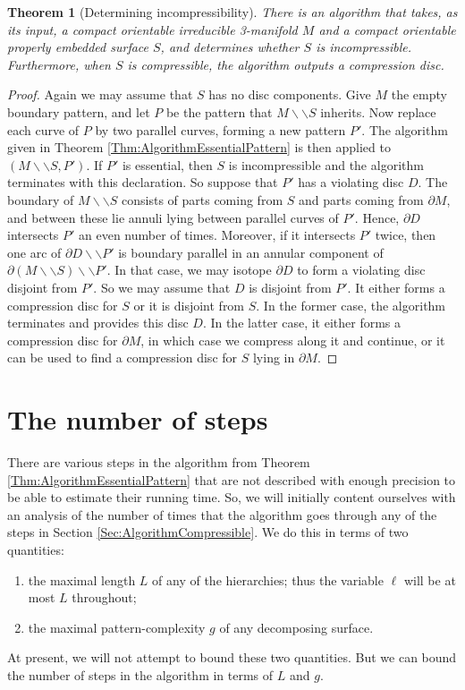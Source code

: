 \documentclass[oneside]{amsart}
\numberwithin{equation}{section}
\theoremstyle{plain}
\newtheorem{theorem}[equation]{Theorem}
\theoremstyle{definition}
\newcommand{\cut}{\backslash\backslash}
\begin{document}
\begin{theorem}[{\sc Determining incompressibility}] 
There is an algorithm that takes, as its input, a compact orientable irreducible 3-manifold $M$ and a compact orientable properly embedded surface $S$, 
and determines whether $S$ is incompressible. Furthermore, when $S$ is compressible, the algorithm outputs a compression disc.
\end{theorem}

\begin{proof}
Again we may assume that $S$ has no disc components.
Give $M$ the empty boundary pattern, and let $P$ be the pattern that $M \cut S$ inherits. Now replace each curve of $P$ by two parallel curves, forming a new pattern $P'$. The algorithm given in Theorem \ref{Thm:AlgorithmEssentialPattern} is then applied to $(M \cut S, P')$.  If $P'$ is essential, then $S$ is incompressible and the algorithm terminates with this declaration. So suppose that $P'$ has a violating disc $D$. The boundary of $M \cut S$ consists of parts coming from $S$ and parts coming from $\partial M$, and between these lie annuli lying between parallel curves of $P'$. Hence, $\partial D$ intersects $P'$ an even number of times. Moreover, if it intersects $P'$ twice, then one arc of $\partial D \cut P'$ is boundary parallel in an annular component of $\partial (M \cut S) \cut P'$. In that case, we may isotope $\partial D$ to form a violating disc disjoint from $P'$. So we may assume that $D$ is disjoint from $P'$. It either forms a compression disc for $S$ or it is disjoint from $S$. In the former case, the algorithm terminates and provides this disc $D$. In the latter case, it either forms a compression disc for $\partial M$, in which case we compress along it and continue, or it can be used to find a compression disc for $S$ lying in $\partial M$.
\end{proof}




\section{The number of steps}
\label{Sec:NumberSteps}

There are various steps in the algorithm 
from Theorem \ref{Thm:AlgorithmEssentialPattern}
that are not described with enough precision to be able to estimate their running time. So, we will initially content ourselves with an analysis of the number of times that the algorithm goes through any of the steps in Section \ref{Sec:AlgorithmCompressible}. We do this in terms of two quantities:
\begin{enumerate}
\item the maximal length $L$ of any of the hierarchies; thus the variable $\ell$ will be at most $L$ throughout;
\item the maximal pattern-complexity $g$ of any decomposing surface.
\end{enumerate}
At present, we will not attempt to bound these two quantities. But we can bound the number of steps in the algorithm in terms of $L$ and $g$.
\end{document}
